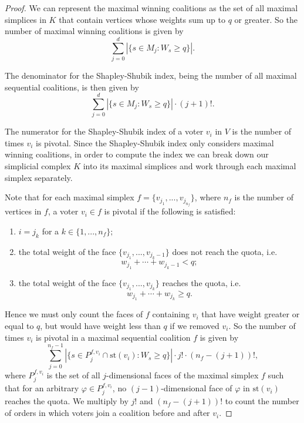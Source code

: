 \documentclass[11pt]{amsart}
\newcommand{\ifn}[1]{\footnote{{\bf Ismar: }#1}} %
\theoremstyle{plain}
\theoremstyle{definition}
\theoremstyle{remark}
\begin{document}
\begin{proof}
We can represent the maximal winning coalitions as the set of all maximal simplices in $K$ that contain vertices whose weights sum up to $q$ or greater. So the number of maximal winning coalitions is given by
$$\sum_{j=0}^d |\{s\in M_j: W_s \geq q\}|.$$

The denominator for the Shapley-Shubik index, being the number of all maximal sequential coalitions, is then given by
$$\sum_{j=0}^d |\{s\in M_j: W_s \geq q\}|\cdot (j+1)!.$$

The numerator for the Shapley-Shubik index of a voter $v_i$ in $V$ is the number of times $v_i$ is pivotal. Since the Shapley-Shubik index only considers maximal winning coalitions, in order to compute the index we can break down our simplicial complex $K$ into its maximal simplices and work through each maximal simplex separately. 

Note that for each maximal simplex $f=\{v_{j_1},...,v_{j_{n_f}}\}$, where $n_f$ is the number of vertices in $f$, a voter $v_i \in f$ is pivotal if the following is satisfied:
\begin{enumerate}
\item[(i)] $i=j_k$ for a $k\in \{1,...,n_f\};$
\item[(ii)]  the total weight of the face $\{v_{j_1},...,v_{j_k-1}\}$ does not reach the quota, i.e.
$$w_{j_1}+\cdots+w_{j_k-1}<q;$$
\item[(iii)]  the total weight of the face $\{v_{j_1},...,v_{j_k}\}$ reaches the quota, i.e.
$$w_{j_1}+\cdots+w_{j_k}\geq q.$$
\end{enumerate}

Hence we must only count the faces of $f$ containing $v_i$ that have weight greater or equal to $q$, but would have weight less than $q$ if we removed $v_i$. So the number of times $v_i$ is pivotal in a maximal sequential coalition $f$ is given by
$$\sum_{j=0}^{n_f-1} |\{s\in P_{j}^{f, v_i} \cap \text{st}(v_i): W_s \geq q\}|\cdot j! \cdot (n_f-(j+1))!,$$
where $P_{j}^{f, v_i}$ is the set of all $j$-dimensional faces of the maximal simplex $f$ such that for an arbitrary $\varphi \in P_{j}^{f, v_i}$, no $(j-1)$-dimensional face of $\varphi$ in $\text{st}(v_i)$ reaches the quota.
We multiply by $j!$ and $(n_f-(j+1))!$ to count the number of orders in which voters join a coalition before and after $v_i$.


\end{proof}
\end{document}
